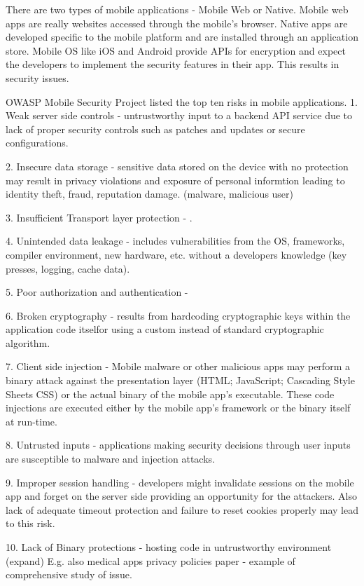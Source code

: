\documentclass{mproj}
\begin{document}
There are two types of mobile applications - Mobile Web or Native. Mobile web apps are really websites accessed through the mobile's browser. Native apps are developed specific to the mobile platform and are installed through an application store. Mobile OS like iOS and Android provide APIs for encryption and expect the developers to implement the security features in their app. This results in security issues.

OWASP Mobile Security Project listed the top ten risks in mobile applications\cite{owsasp}.
1. Weak server side controls - untrustworthy input to a backend API service due to lack of proper security controls such as patches and updates or secure configurations.

2. Insecure data storage - sensitive data stored on the device with no protection may result in privacy violations and exposure of personal informtion leading to identity theft, fraud, reputation damage. (malware, malicious user)

3. Insufficient Transport layer protection - .

4. Unintended data leakage -  includes vulnerabilities from the OS, frameworks, compiler environment, new hardware, etc. without a developers knowledge (key presses, logging, cache data).

5. Poor authorization and authentication - 

6. Broken cryptography - results from hardcoding cryptographic keys within the application code itselfor using a custom instead of standard cryptographic algorithm.

7. Client side injection - Mobile malware or other malicious apps may perform a binary attack against the presentation layer (HTML; JavaScript; Cascading Style Sheets CSS) or the actual binary of the mobile app's executable. These code injections are executed either by the mobile app's framework or the binary itself at run-time.

8. Untrusted inputs - applications making security decisions through user inputs are susceptible to malware and injection attacks.

9. Improper session handling - developers might invalidate sessions on the mobile app and forget on the server side providing an opportunity for the attackers. Also lack of adequate timeout protection and failure to reset cookies properly may lead to this risk.

10. Lack of Binary protections - hosting code in untrustworthy environment (expand)
E.g. also medical apps privacy policies paper - example of comprehensive study of issue.
\end{document}
